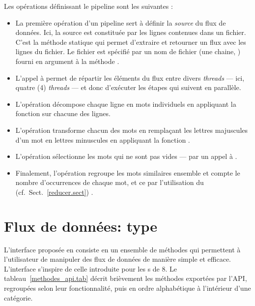 \goodbreak
Les op\'erations d\'efinissant le pipeline sont les suivantes :
\begin{itemize}

\item  La premi\`ere op\'eration d'un pipeline sert \`a d\'efinir la \emph{source} du flux de donn\'ees. Ici, la source est
constitu\'ee par les lignes contenues dans un fichier. C'est la
m\'ethode statique  qui permet d'extraire et retourner un
flux avec les lignes du fichier. Le fichier est sp\'ecifi\'e par un nom de fichier
(une chaine, ) fourni en argument \`a la m\'ethode
.


\item L'appel \`a  permet de r\'epartir les \'el\'ements du flux entre divers \emph{threads} --- ici, quatre (4) \emph{threads} --- et donc d'ex\'ecuter les \'etapes qui suivent en parall\`ele. 



\item L'op\'eration  d\'ecompose chaque ligne en mots individuels en appliquant la fonction  sur chacune des lignes.

\item L'op\'eration  transforme chacun des mots en rempla\c{c}ant les lettres majuscules d'un mot en lettres minuscules en appliquant la fonction .

\item L'op\'eration  s\'electionne les mots qui ne sont pas vides --- par un appel \`a .

\item Finalement, l'op\'eration   regroupe les mots similaires ensemble et compte le nombre d'occurrences de chaque mot, et ce par l'utilisation du  (cf.~Sect.~\ref{reducer.sect}) . 
\end{itemize}


\section{Flux de donn\'ees: type }

L'interface propos\'ee en  consiste en un ensemble de m\'ethodes qui permettent \`a l'utilisateur de manipuler des flux de donn\'ees de mani\`ere simple et efficace. L'interface s'inspire de celle introduite pour les s de  8. Le tableau~\ref{methodes_api.tab} d\'ecrit bri\`evement les m\'ethodes export\'ees par l'API, regroup\'ees selon leur fonctionnalit\'e, puis en ordre alphab\'etique \`a l'int\'erieur d'une cat\'egorie.


